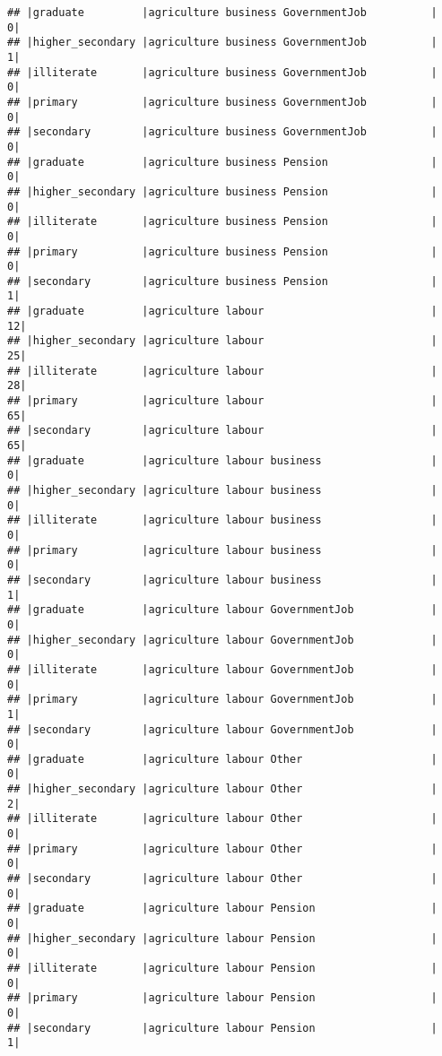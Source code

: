 \documentclass[
]{article}
\begin{document}
\begin{verbatim}
## |graduate         |agriculture business GovernmentJob          |     0|
## |higher_secondary |agriculture business GovernmentJob          |     1|
## |illiterate       |agriculture business GovernmentJob          |     0|
## |primary          |agriculture business GovernmentJob          |     0|
## |secondary        |agriculture business GovernmentJob          |     0|
## |graduate         |agriculture business Pension                |     0|
## |higher_secondary |agriculture business Pension                |     0|
## |illiterate       |agriculture business Pension                |     0|
## |primary          |agriculture business Pension                |     0|
## |secondary        |agriculture business Pension                |     1|
## |graduate         |agriculture labour                          |    12|
## |higher_secondary |agriculture labour                          |    25|
## |illiterate       |agriculture labour                          |    28|
## |primary          |agriculture labour                          |    65|
## |secondary        |agriculture labour                          |    65|
## |graduate         |agriculture labour business                 |     0|
## |higher_secondary |agriculture labour business                 |     0|
## |illiterate       |agriculture labour business                 |     0|
## |primary          |agriculture labour business                 |     0|
## |secondary        |agriculture labour business                 |     1|
## |graduate         |agriculture labour GovernmentJob            |     0|
## |higher_secondary |agriculture labour GovernmentJob            |     0|
## |illiterate       |agriculture labour GovernmentJob            |     0|
## |primary          |agriculture labour GovernmentJob            |     1|
## |secondary        |agriculture labour GovernmentJob            |     0|
## |graduate         |agriculture labour Other                    |     0|
## |higher_secondary |agriculture labour Other                    |     2|
## |illiterate       |agriculture labour Other                    |     0|
## |primary          |agriculture labour Other                    |     0|
## |secondary        |agriculture labour Other                    |     0|
## |graduate         |agriculture labour Pension                  |     0|
## |higher_secondary |agriculture labour Pension                  |     0|
## |illiterate       |agriculture labour Pension                  |     0|
## |primary          |agriculture labour Pension                  |     0|
## |secondary        |agriculture labour Pension                  |     1|

\end{verbatim}
\end{document}
